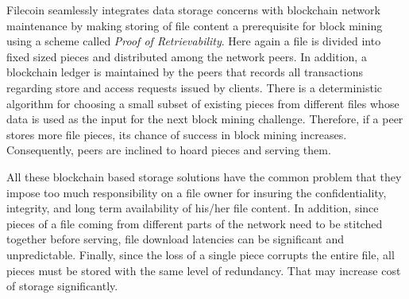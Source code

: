 \documentclass[conference]{IEEEtran}
\begin{document}
Filecoin \cite{filecoin} seamlessly integrates data storage concerns with blockchain network maintenance by making storing of file content a prerequisite for block mining using a scheme called {\it Proof of Retrievability}. Here again a file is divided into fixed sized pieces and distributed among the network peers. In addition, a blockchain ledger is maintained by the peers that records all transactions regarding store and access requests issued by clients. There is a deterministic algorithm for choosing a small subset of existing pieces from different files whose data is used as the input for the next block mining challenge. Therefore, if a peer stores more file pieces, its chance of success in block mining increases. Consequently, peers are inclined to hoard pieces and serving them.   

All these blockchain based storage solutions have the common problem that they impose too much responsibility on a file owner for insuring the confidentiality, integrity, and long term availability of his/her file content. In addition, since pieces of a file coming from different parts of the network need to be stitched together before serving, file download latencies can be significant and unpredictable. Finally, since the loss of a single piece corrupts the entire file, all pieces must be stored with the same level of redundancy. That may increase cost of storage significantly.


 


\end{document}
